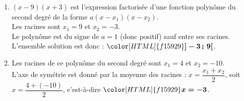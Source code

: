 \documentclass[a4paper,11pt,landscape,exos]{nsi} %
\begin{document}
\begin{multicols}{2}
\begin{enumerate}[itemsep=1em]
     
    \item $(x-9)(x+3)$ est l'expression factorisée d'une fonction polynôme du second degré de la forme $a(x-x_1)(x-x_2)$.\\
        Les racines sont $x_1=9$ et $x_2=-3$. \\
        Le polynôme est du signe de $a=1$ (donc positif) sauf entre ses racines.\\
        L'ensemble solution est donc :  ${\color[HTML]{f15929}\boldsymbol{]-3\,;\,9[}}$.   
         
    \item Les racines de ce polynôme du second degré sont $x_1=4$ et $x_2=-10$.\\
    L'axe de symétrie est donné par la moyenne des racines : $x=\dfrac{x_1+x_2}{2}$, soit $x=\dfrac{4+(-10)}{2}$, c'est-à-dire ${\color[HTML]{f15929}\boldsymbol{x=-3}}$.
\end{enumerate}
\end{multicols}
\end{document}
